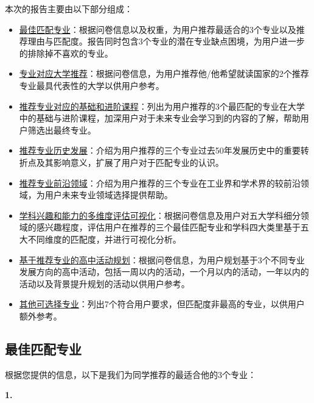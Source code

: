 \documentclass[12pt]{article}
\begin{document}
\begin{CJK*}{UTF8}{gbsn}
   \newpage
   \hspace{0pt}
   \vspace{0cm}
   \begin{flushleft}
   本次的报告主要由以下部分组成：
   \begin{itemize} 
       \item \underline{最佳匹配专业}：根据问卷信息以及权重，为用户推荐最适合的3个专业以及推荐理由与匹配度。报告同时包含3个专业的潜在专业缺点困境，为用户进一步的排除掉不喜欢的专业。
       \item \underline{专业对应大学推荐}：根据问卷信息，为用户推荐他/他希望就读国家的2个推荐专业最具代表性的大学以供用户参考。
       \item \underline{推荐专业对应的基础和进阶课程}：列出为用户推荐的3个最匹配的专业在大学中的基础与进阶课程，加深用户对于未来专业会学习到的内容的了解，帮助用户筛选出最终专业。
       \item \underline{推荐专业历史发展}：介绍为用户推荐的三个专业过去50年发展历史中的重要转折点及其影响意义，扩展了用户对于匹配专业的认识。
       \item \underline{推荐专业前沿领域}：介绍为用户推荐的三个专业在工业界和学术界的较前沿领域，为用户未来专业领域选择提供帮助。
       \item \underline{学科兴趣和能力的多维度评估可视化}：根据问卷信息及用户对五大学科细分领域的感兴趣程度，评估用户在推荐的三个最佳匹配专业和学科四大类里基于五大不同维度的匹配度，并进行可视化分析。
       \item \underline{基于推荐专业的高中活动规划}：根据问卷信息，为用户规划基于3个不同专业发展方向的高中活动，包括一周以内的活动，一个月以内的活动，一年以内的活动以及背景提升规划的活动以供用户参考。
       \item \underline{其他可选择专业}：列出7个符合用户要求，但匹配度非最高的专业，以供用户额外参考。
   \end{itemize}
   \end{flushleft}
   \hspace{0pt}
   \vfill
   



\newpage
\subsection*{最佳匹配专业}
根据您提供的信息，以下是我们为同学推荐的最适合他的3个专业：
   
\textbf{1.} %



\end{CJK*}
\end{document}
